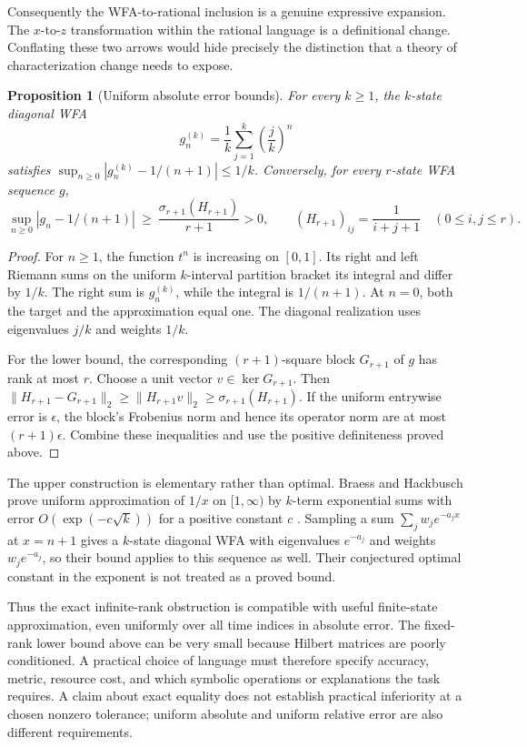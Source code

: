 \documentclass[11pt]{article}
\newtheorem{proposition}[theorem]{Proposition}
\theoremstyle{definition}
\begin{document}
Consequently the WFA-to-rational inclusion is a genuine expressive expansion.
The $x$-to-$z$ transformation within the rational language is a definitional
change. Conflating these two arrows would hide precisely the distinction
that a theory of characterization change needs to expose.

\begin{proposition}[Uniform absolute error bounds]
\label{prop:cc-approximation}
For every $k\ge1$, the $k$-state diagonal WFA
\[
 g_n^{(k)}=\frac1k\sum_{j=1}^k\left(\frac jk\right)^n
\]
satisfies $\sup_{n\ge0}|g_n^{(k)}-1/(n+1)|\le1/k$.
Conversely, for every $r$-state WFA sequence $g$,
\[
 \sup_{n\ge0}|g_n-1/(n+1)|
 \ \ge\ \frac{\sigma_{r+1}(H_{r+1})}{r+1}>0,
 \qquad (H_{r+1})_{ij}=\frac1{i+j+1}\quad(0\le i,j\le r).
\]
\end{proposition}
\begin{proof}
For $n\ge1$, the function $t^n$ is increasing on $[0,1]$. Its right and
left Riemann sums on the uniform $k$-interval partition bracket its integral
and differ by $1/k$. The right sum is $g_n^{(k)}$, while the integral is
$1/(n+1)$. At $n=0$, both the target and the approximation equal one.
The diagonal realization uses eigenvalues $j/k$ and weights $1/k$.

For the lower bound, the corresponding $(r+1)$-square block $G_{r+1}$ of $g$
has rank at most $r$. Choose a unit vector $v\in\ker G_{r+1}$. Then
$\|H_{r+1}-G_{r+1}\|_2\ge\|H_{r+1}v\|_2\ge\sigma_{r+1}(H_{r+1})$. If the uniform
entrywise error is $\epsilon$, the block's Frobenius norm and hence its
operator norm are at most $(r+1)\epsilon$. Combine these inequalities and
use the positive definiteness proved above.
\end{proof}

The upper construction is elementary rather than optimal. Braess and
Hackbusch prove uniform approximation of $1/x$ on $[1,\infty)$ by
$k$-term exponential sums with error $O(\exp(-c\sqrt{k}))$ for a positive
constant $c$ \cite{cc-braess-hackbusch}. Sampling a sum
$\sum_j w_j e^{-a_jx}$ at $x=n+1$ gives a $k$-state diagonal WFA with
eigenvalues $e^{-a_j}$ and weights $w_je^{-a_j}$, so their bound applies
to this sequence as well. Their conjectured optimal constant in the exponent
is not treated as a proved bound.

Thus the exact infinite-rank obstruction is compatible with useful
finite-state approximation, even uniformly over all time indices in
absolute error. The fixed-rank lower bound above can be very small because
Hilbert matrices are poorly conditioned. A practical choice of language
must therefore specify accuracy, metric, resource cost, and which symbolic
operations or explanations the task requires. A claim about exact equality
does not establish practical inferiority at a chosen nonzero tolerance;
uniform absolute and uniform relative error are also different requirements.
\end{document}
